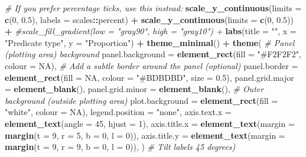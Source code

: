 \documentclass[
]{article}
\newenvironment{Shaded}{\begin{snugshade}}{\end{snugshade}}
\newcommand{\AttributeTok}[1]{\textcolor[rgb]{0.13,0.29,0.53}{#1}}
\newcommand{\CommentTok}[1]{\textcolor[rgb]{0.56,0.35,0.01}{\textit{#1}}}
\newcommand{\ConstantTok}[1]{\textcolor[rgb]{0.56,0.35,0.01}{#1}}
\newcommand{\DecValTok}[1]{\textcolor[rgb]{0.00,0.00,0.81}{#1}}
\newcommand{\FloatTok}[1]{\textcolor[rgb]{0.00,0.00,0.81}{#1}}
\newcommand{\FunctionTok}[1]{\textcolor[rgb]{0.13,0.29,0.53}{\textbf{#1}}}
\newcommand{\NormalTok}[1]{#1}
\newcommand{\SpecialCharTok}[1]{\textcolor[rgb]{0.81,0.36,0.00}{\textbf{#1}}}
\newcommand{\StringTok}[1]{\textcolor[rgb]{0.31,0.60,0.02}{#1}}
\begin{document}
\begin{Shaded}
\begin{Highlighting}[]
\CommentTok{\# If you prefer percentage ticks, use this instead:}
  \FunctionTok{scale\_y\_continuous}\NormalTok{(}\AttributeTok{limits =} \FunctionTok{c}\NormalTok{(}\DecValTok{0}\NormalTok{, }\FloatTok{0.5}\NormalTok{), }\AttributeTok{labels =}\NormalTok{ scales}\SpecialCharTok{::}\NormalTok{percent) }\SpecialCharTok{+}
  \FunctionTok{scale\_y\_continuous}\NormalTok{(}\AttributeTok{limits =} \FunctionTok{c}\NormalTok{(}\DecValTok{0}\NormalTok{, }\FloatTok{0.5}\NormalTok{)) }\SpecialCharTok{+}
  \CommentTok{\#scale\_fill\_gradient(low = "gray90", high = "gray10") +}
  \FunctionTok{labs}\NormalTok{(}\AttributeTok{title =} \StringTok{""}\NormalTok{,}
       \AttributeTok{x =} \StringTok{"Predicate type"}\NormalTok{,}
       \AttributeTok{y =} \StringTok{"Proportion"}\NormalTok{) }\SpecialCharTok{+}
  \FunctionTok{theme\_minimal}\NormalTok{() }\SpecialCharTok{+}
  \FunctionTok{theme}\NormalTok{( }
\CommentTok{\# Panel (plotting area) background}
    \AttributeTok{panel.background =} \FunctionTok{element\_rect}\NormalTok{(}\AttributeTok{fill =} \StringTok{"\#F2F2F2"}\NormalTok{, }\AttributeTok{colour =} \ConstantTok{NA}\NormalTok{),}
    \CommentTok{\# Add a subtle border around the panel (optional)}
    \AttributeTok{panel.border =} \FunctionTok{element\_rect}\NormalTok{(}\AttributeTok{fill =} \ConstantTok{NA}\NormalTok{, }\AttributeTok{colour =} \StringTok{"\#BDBDBD"}\NormalTok{, }\AttributeTok{size =} \FloatTok{0.5}\NormalTok{),}
  \AttributeTok{panel.grid.major =} \FunctionTok{element\_blank}\NormalTok{(),}
  \AttributeTok{panel.grid.minor =} \FunctionTok{element\_blank}\NormalTok{(),}
\CommentTok{\# Outer background (outside plotting area)}
    \AttributeTok{plot.background  =} \FunctionTok{element\_rect}\NormalTok{(}\AttributeTok{fill =} \StringTok{"white"}\NormalTok{, }\AttributeTok{colour =} \ConstantTok{NA}\NormalTok{),}
    \AttributeTok{legend.position =} \StringTok{"none"}\NormalTok{, }\AttributeTok{axis.text.x =} \FunctionTok{element\_text}\NormalTok{(}\AttributeTok{angle =} \DecValTok{45}\NormalTok{, }\AttributeTok{hjust =} \DecValTok{1}\NormalTok{),}
\AttributeTok{axis.title.x =} \FunctionTok{element\_text}\NormalTok{(}\AttributeTok{margin =} \FunctionTok{margin}\NormalTok{(}\AttributeTok{t =} \DecValTok{9}\NormalTok{, }\AttributeTok{r =} \DecValTok{5}\NormalTok{, }\AttributeTok{b =} \DecValTok{0}\NormalTok{, }\AttributeTok{l =} \DecValTok{0}\NormalTok{)),}
\AttributeTok{axis.title.y =} \FunctionTok{element\_text}\NormalTok{(}\AttributeTok{margin =} \FunctionTok{margin}\NormalTok{(}\AttributeTok{t =} \DecValTok{9}\NormalTok{, }\AttributeTok{r =} \DecValTok{9}\NormalTok{, }\AttributeTok{b =} \DecValTok{0}\NormalTok{, }\AttributeTok{l =} \DecValTok{0}\NormalTok{)), }
\NormalTok{)  }\CommentTok{\# Tilt labels 45 degrees)}
\end{Highlighting}
\end{Shaded}
\end{document}
